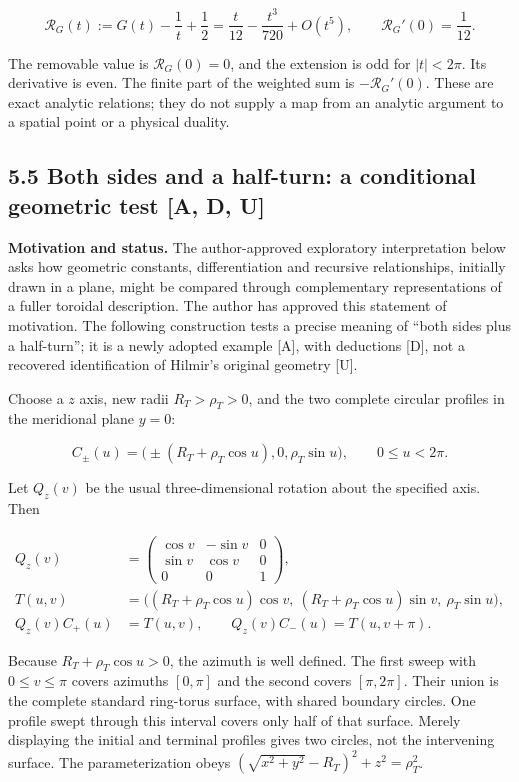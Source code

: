 \documentclass[11pt,a4paper]{article}
\begin{document}
\[
\mathcal R_G(t):=G(t)-\frac1t+\frac12
=\frac{t}{12}-\frac{t^3}{720}+O(t^5),\qquad
\mathcal R_G'(0)=\frac1{12}. \tag{21i}
\]

The removable value is $\mathcal R_G(0)=0$, and the extension is odd for $|t|<2\pi$. Its derivative is even. The finite part of the weighted sum is $-\mathcal R_G'(0)$. These are exact analytic relations; they do not supply a map from an analytic argument to a spatial point or a physical duality.

\subsection*{5.5 Both sides and a half-turn: a conditional geometric test [A, D, U]}

\textbf{Motivation and status.} The author-approved exploratory interpretation below asks how geometric constants, differentiation and recursive relationships, initially drawn in a plane, might be compared through complementary representations of a fuller toroidal description. The author has approved this statement of motivation. The following construction tests a precise meaning of ``both sides plus a half-turn''; it is a newly adopted example [A], with deductions [D], not a recovered identification of Hilmir's original geometry [U].

Choose a $z$ axis, new radii $R_T>\rho_T>0$, and the two complete circular profiles in the meridional plane $y=0$:

\[
C_\pm(u)=\bigl(\pm(R_T+\rho_T\cos u),0,\rho_T\sin u\bigr),\qquad 0\leq u<2\pi. \tag{21j}
\]

Let $Q_z(v)$ be the usual three-dimensional rotation about the specified axis. Then

\[
\begin{aligned}
Q_z(v)&=\begin{pmatrix}\cos v&-\sin v&0\\\sin v&\cos v&0\\0&0&1\end{pmatrix},\\
T(u,v)&=\bigl((R_T+\rho_T\cos u)\cos v,\ (R_T+\rho_T\cos u)\sin v,\ \rho_T\sin u\bigr),\\
Q_z(v)C_+(u)&=T(u,v),\qquad Q_z(v)C_-(u)=T(u,v+\pi).
\end{aligned} \tag{21k}
\]

Because $R_T+\rho_T\cos u>0$, the azimuth is well defined. The first sweep with $0\leq v\leq\pi$ covers azimuths $[0,\pi]$ and the second covers $[\pi,2\pi]$. Their union is the complete standard ring-torus surface, with shared boundary circles. One profile swept through this interval covers only half of that surface. Merely displaying the initial and terminal profiles gives two circles, not the intervening surface. The parameterization obeys $(\sqrt{x^2+y^2}-R_T)^2+z^2=\rho_T^2$.
\end{document}

